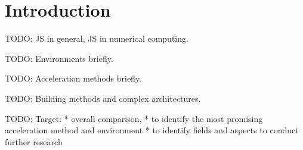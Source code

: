 \section{Introduction}\label{sec:introduction}

TODO: JS in general, JS in numerical computing.

TODO: Environments briefly.

TODO: Acceleration methods briefly.

TODO: Building methods and complex architectures.

TODO: Target:
* overall comparison,
* to identify the most promising acceleration method and environment 
* to identify fields and aspects to conduct further research
